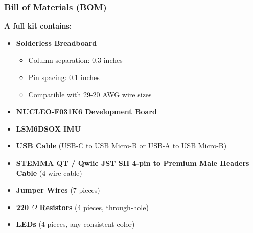 \documentclass{beamer}
\begin{document}
\begin{frame}
    \frametitle{Bill of Materials (BOM)}
    \textbf{A full kit contains:}
    \begin{itemize}
        \item \textbf{Solderless Breadboard}
        \begin{itemize}
            \item Column separation: 0.3 inches
            \item Pin spacing: 0.1 inches
            \item Compatible with 29-20 AWG wire sizes
        \end{itemize}
        \item \textbf{NUCLEO-F031K6 Development Board}
        \item \textbf{LSM6DSOX IMU}
        \item \textbf{USB Cable} (USB-C to USB Micro-B or USB-A to USB Micro-B)
        \item \textbf{STEMMA QT / Qwiic JST SH 4-pin to Premium Male Headers Cable} (4-wire cable)
        \item \textbf{Jumper Wires} (7 pieces)
        \item \textbf{220 $\Omega$ Resistors} (4 pieces, through-hole)
        \item \textbf{LEDs} (4 pieces, any consistent color)
    \end{itemize}
\end{frame}
\end{document}
